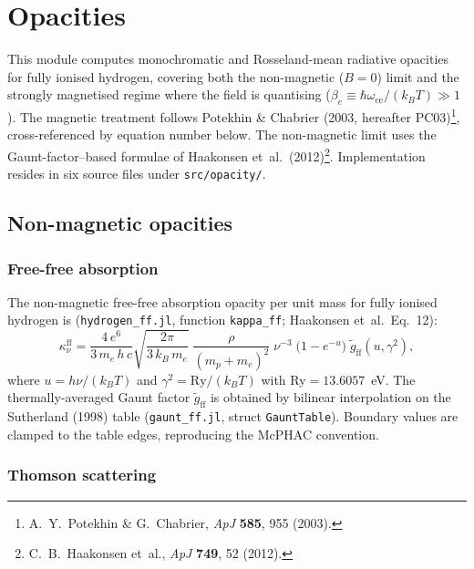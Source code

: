 \section{Opacities}
\label{sec:opacities}

This module computes monochromatic and Rosseland-mean radiative opacities
for fully ionised hydrogen, covering both the non-magnetic ($B=0$) limit
and the strongly magnetised regime where the field is quantising
($\beta_e \equiv \hbar\omega_{\mathrm{ce}}/(k_B T) \gg 1$).
The magnetic treatment follows Potekhin \& Chabrier (2003, hereafter
PC03)\footnote{A.~Y.~Potekhin \& G.~Chabrier, \emph{ApJ} \textbf{585},
955 (2003).}, cross-referenced by equation number below.
The non-magnetic limit uses the Gaunt-factor--based formulae of Haakonsen
et~al.\ (2012)\footnote{C.~B.~Haakonsen et~al., \emph{ApJ} \textbf{749},
52 (2012).}.
Implementation resides in six source files under \texttt{src/opacity/}.


\subsection{Non-magnetic opacities}
\label{sec:opacity:nonmag}

\subsubsection{Free-free absorption}
\label{sec:opacity:nonmag:ff}

\noindent
The non-magnetic free-free absorption opacity per unit mass for fully
ionised hydrogen is
(\texttt{hydrogen\_ff.jl}, function \texttt{kappa\_ff}; Haakonsen et~al.\
Eq.~12):
%
\begin{equation}
\label{eq:kappa_ff_nonmag}
\kappa_\nu^{\mathrm{ff}}
  = \frac{4\,e^6}{3\,m_e\,h\,c}
    \sqrt{\frac{2\pi}{3\,k_B\,m_e}}\;
    \frac{\rho}{(m_p+m_e)^2}\;
    \nu^{-3}\;
    \bigl(1-e^{-u}\bigr)\;\tilde{g}_{\mathrm{ff}}(u,\gamma^2),
\end{equation}
%
where $u = h\nu/(k_B T)$ and $\gamma^2 = \mathrm{Ry}/(k_B T)$ with
Ry${}= 13.6057$~eV.  The thermally-averaged Gaunt factor
$\tilde{g}_{\mathrm{ff}}$ is obtained by bilinear interpolation on the
Sutherland (1998) table (\texttt{gaunt\_ff.jl}, struct
\texttt{GauntTable}).  Boundary values are clamped to the table edges,
reproducing the McPHAC convention.

\subsubsection{Thomson scattering}
\label{sec:opacity:nonmag:thomson}

